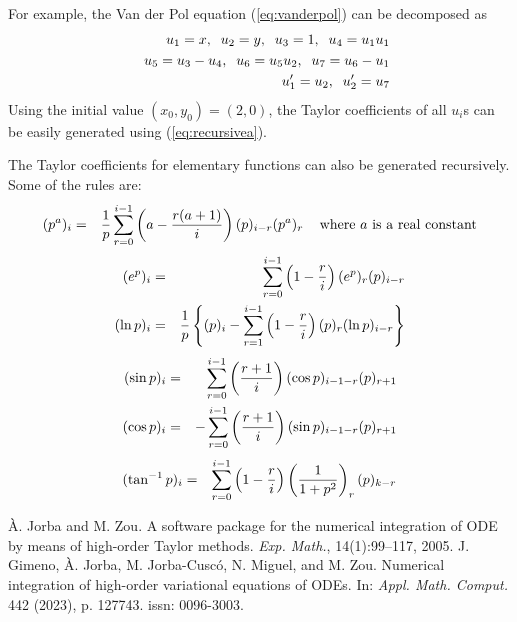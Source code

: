 \documentclass[10pt]{article}
\theoremstyle{remark}
\begin{document}
For example, the Van der Pol equation (\ref{eq:vanderpol}) can be
decomposed as
\begin{eqnarray*}
& & u_1 = x,\;\;  u_2 = y,\;\; u_3 = 1,\;\; u_4= u_1 u_1\cr
& & u_5 = u_3-u_4,\;\; u_6 = u_5 u_2,\;\; u_7= u_6-u_1\cr
& & u_1' = u_2, \;\; u_2'= u_7
\end{eqnarray*}
Using the initial value $(x_0, y_0)=(2, 0)$, the Taylor coefficients
of all $u_i$s can be easily generated using (\ref{eq:recursivea}).


The Taylor coefficients for elementary functions can also be generated
recursively. Some of the rules are:
\begin{eqnarray*}
(p^a)_i &=& {1 \over p} \sum_{r=0}^{i-1}\left(
a - { {r(a+1)\over i}}\right)(p)_{i-r}(p^a)_r\;\;\; \mbox{
where $a$ is a real constant} 
\end{eqnarray*}
\begin{eqnarray*}
(e^p)_i &=& \sum_{r=0}^{i-1} \left(1-{r\over i}\right)
(e^p)_r (p)_{i-r}\cr
(\ln p)_i &=& {1\over {p}} \left\{ (p)_i - \sum_{r=1}^{i-1}
\left(1 - {r\over i}\right)(p)_r(\ln p)_{i-r}\right\}
\end{eqnarray*}
\begin{eqnarray*}
(\sin p)_i &=& \sum_{r=0}^{i-1}\left({{r+1}\over
i}\right)(\cos p)_{i-1-r} (p)_{r+1}\cr
(\cos p)_i &=& -\sum_{r=0}^{i-1}\left({{r+1}\over
i}\right)(\sin p)_{i-1-r} (p)_{r+1}\cr
\end{eqnarray*}
\begin{eqnarray*}
(\tan^{-1} p)_i &=& \sum_{r=0}^{i-1}\left(1 - {r\over i}\right)
\left( {1 \over {1+p^2}}\right)_r (p)_{k-r}
\end{eqnarray*}



\begin{thebibliography}{9}
 \`A. Jorba and M. Zou. A software package for the
  numerical integration of ODE by means of high-order Taylor
  methods. {\it Exp. Math.}, 14(1):99–117, 2005.
 J. Gimeno, \`A. Jorba, M. Jorba-Cusc\'o, N. Miguel,
  and M. Zou. Numerical integration of high-order variational
  equations of ODEs. In: {\it Appl. Math. Comput.} 442 (2023),
  p. 127743. {\sc issn}: 0096-3003.
\end{thebibliography}
\end{document}
